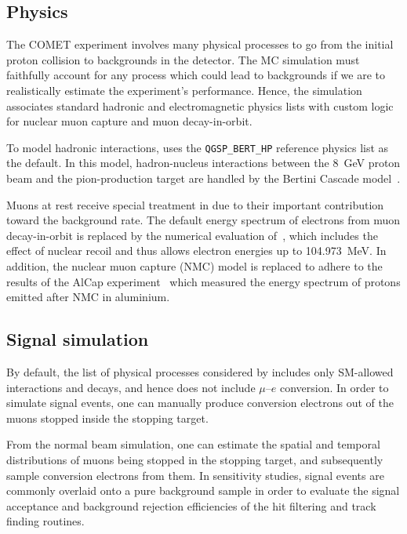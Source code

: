 
\subsection{Physics}
The COMET experiment involves many physical processes to go from the initial
proton collision to backgrounds in the detector. The MC simulation must
faithfully account for any process which could lead to backgrounds if we are to
realistically estimate the experiment's performance. Hence, the \SimG simulation
associates standard \Geant hadronic and electromagnetic physics lists with
custom logic for nuclear muon capture and muon decay-in-orbit.

To model hadronic interactions, \SimG uses the \texttt{QGSP\_BERT\_HP} reference
physics list as the default. In this model, hadron-nucleus interactions between
the \SI{8}{\GeV} proton beam and the pion-production target are handled by the
Bertini Cascade model~\cite{WRIGHT2015175}.

Muons at rest receive special treatment in \SimG due to their important
contribution toward the background rate. The default energy spectrum of
electrons from muon decay-in-orbit is replaced by the numerical evaluation
of~\cite{czarnecki}, which includes the effect of nuclear recoil and thus allows
electron energies up to \SI{104.973}{\MeV}. In addition, the nuclear muon
capture (NMC) model is replaced to adhere to the results of the AlCap
experiment~\cite{PhysRevC.105.035501} which measured the energy spectrum of
protons emitted after NMC in aluminium.




\subsection{Signal simulation}
By default, the list of physical processes considered by \SimG includes only
SM-allowed interactions and decays, and hence does not include $\mu$--$e$
conversion. In order to simulate signal events, one can manually produce
conversion electrons out of the muons stopped inside the stopping target.

From the normal beam simulation, one can estimate the spatial and temporal
distributions of muons being stopped in the stopping target, and subsequently
sample conversion electrons from them. In sensitivity studies, signal events are
commonly overlaid onto a pure background sample in order to evaluate the signal
acceptance and background rejection efficiencies of the hit filtering and track
finding routines.


